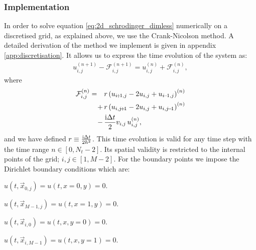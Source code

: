     \subsubsection{Implementation}\label{sec:methods:numerical_scheme:implementation}
        In order to solve equation \eqref{eq:2d_schrodinger_dimless} numerically on a discretised grid, as explained above, we use the Crank-Nicolson method. A detailed derivation of the method we implement is given in appendix \ref{app:discretisation}. It allows us to express the time evolution of the system as:
        \begin{align}\label{eq:equation_to_solve_non-matrix}
            u_{i,j}^{(n+1)} - \mathcal{F}_{i,j}^{(n+1)} = u_{i, j}^{(n)} + \mathcal{F}_{i,j}^{(n)},
        \end{align}
        where
        \begin{equation}
            \begin{split}
            \mathcal{F}_{i,j}^{(n)} = \quad&r\closed{ u_{i\!+\!1, j}-2u_{i,j} + u_{i\!-\!1, j}}^{(n)}  \\
            +\,&  r\closed{u_{i,j\!+\!1}-2u_{i,j} + u_{i,j\!-\!1}}^{(n)}\\ 
            -\,& \frac{\im \Delta t}{2} v_{i,j}\,u_{i,j}^{(n)},
            \end{split}
        \end{equation}
        and we have defined $r\equiv \frac{\mathrm{i}\Delta t}{2h^2}$. This time evolution is valid for any time step with the time range $n\in[0,N_t-2]$. Its spatial validity is restricted to the internal points of the grid; $i,j\in[1,M-2]$. For the boundary points we impose the Dirichlet boundary conditions which are:
        \begin{itemize*}
            \item[] $u(t, \vec{x}_{0,j})       = u(t, x\!=\!0, y) = 0$. \\
            \item[] $u(t, \vec{x}_{M\!-\!1,j}) = u(t, x\!=\!1, y) = 0$. \\
            \item[] $u(t, \vec{x}_{i,0})       = u(t, x, y\!=\!0) = 0$. \\
            \item[] $u(t, \vec{x}_{i,M\!-\!1}) = u(t, x, y\!=\!1) = 0$.
        \end{itemize*} 

